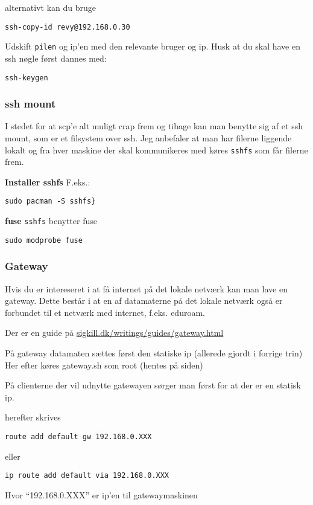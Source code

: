 \documentclass[10pt,a4paper,danish]{article}
\begin{document}
alternativt kan du bruge
\begin{verbatim}
ssh-copy-id revy@192.168.0.30
\end{verbatim}
Udskift \texttt{pilen} og ip'en med den relevante bruger og ip.
Husk at du skal have en ssh nøgle først
dannes med:

\begin{verbatim}
ssh-keygen
\end{verbatim}


\subsubsection{ssh mount}
I stedet for at scp'e alt muligt crap frem og tibage kan man benytte sig af et
ssh mount, som er et filsystem over ssh.
Jeg anbefaler at man har filerne liggende lokalt og fra hver maskine der skal
kommunikeres med køres \texttt{sshfs} som får filerne frem.

\textbf{Installer sshfs}
F.eks.:
\begin{verbatim}
sudo pacman -S sshfs}
\end{verbatim}

\textbf{fuse}
\texttt{sshfs} benytter fuse
\begin{verbatim}
sudo modprobe fuse
\end{verbatim}
\subsubsection{Gateway}
Hvis du er intereseret i at få internet på det lokale netværk kan man lave en
gateway.
Dette består i at en af datamaterne på det lokale netværk også er forbundet til
et netværk med internet, f.eks. eduroam.

Der er en guide på \url{sigkill.dk/writings/guides/gateway.html}

På gateway datamaten sættes først den statiske ip (allerede gjordt i forrige
trin)
Her efter køres gateway.sh som root (hentes på siden)

På clienterne der vil udnytte gatewayen sørger man først for at der er en
statisk ip.

herefter skrives
\begin{verbatim}
route add default gw 192.168.0.XXX
\end{verbatim}

eller
\begin{verbatim}
ip route add default via 192.168.0.XXX
\end{verbatim}
Hvor ``192.168.0.XXX'' er ip'en til gatewaymaskinen
\end{document}
